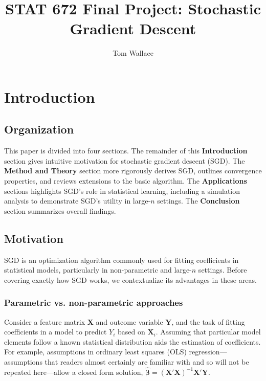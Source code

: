 \documentclass{report}
\author{Tom Wallace}
\title{STAT 672 Final Project: Stochastic Gradient Descent}
\begin{document}
\maketitle

\tableofcontents

\newpage

\chapter{Introduction}

\section{Organization}

This paper is divided into four sections. The remainder of this
\textbf{Introduction} section gives intuitive motivation for stochastic gradient
descent (SGD). The \textbf{Method and Theory} section more rigorously derives
SGD, outlines convergence properties, and reviews extensions to the basic
algorithm. The \textbf{Applications} sections highlights SGD's role in
statistical learning, including a simulation analysis to demonstrate SGD's utility
in large-$n$ settings. The \textbf{Conclusion} section summarizes
overall findings.

\section{Motivation}

SGD is an optimization algorithm commonly used for fitting coefficients
in statistical models, particularly in non-parametric and large-$n$ settings.
Before covering exactly how SGD works, we contextualize its advantages in these areas.

\subsection{Parametric vs. non-parametric approaches}

Consider a feature matrix $\bm{X}$ and outcome variable $\bm{Y}$, and the task
of fitting coefficients in a model to predict $Y_i$ based on $\bm{X}_i$. 
Assuming that particular model elements follow a
known statistical distribution aids the estimation of coefficients. 
For example, assumptions in ordinary least squares (OLS)
regression---assumptions that readers almost certainly are familiar with and so will not be
repeated here---allow a closed form solution, $\hat{\bm{\beta}} = (\bm{X}'\bm{X})^{-1}\bm{X}'\bm{Y}$.
\end{document}
